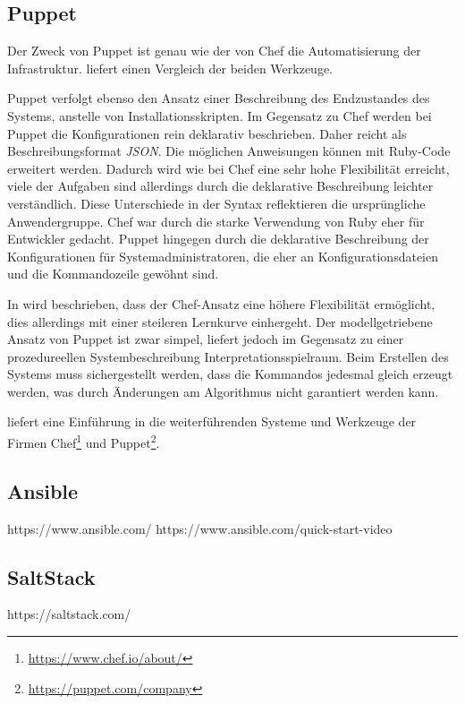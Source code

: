 \subsection{Puppet}
\label{sub:puppet}
Der Zweck von Puppet ist genau wie der von Chef die Automatisierung der Infrastruktur. \autocite{Wolff201604} liefert einen Vergleich der beiden Werkzeuge.

Puppet verfolgt ebenso den Ansatz einer Beschreibung des Endzustandes des Systems, anstelle von Installationsskripten.
Im Gegensatz zu Chef werden bei Puppet die Konfigurationen rein deklarativ beschrieben.
Daher reicht als Beschreibungsformat \emph{JSON}.
Die möglichen Anweisungen können mit Ruby-Code erweitert werden.
Dadurch wird wie bei Chef eine sehr hohe Flexibilität erreicht, viele der Aufgaben sind allerdings durch die deklarative Beschreibung leichter verständlich.
Diese Unterschiede in der Syntax reflektieren die ursprüngliche Anwendergruppe.
Chef war durch die starke Verwendung von Ruby eher für Entwickler gedacht.
Puppet hingegen durch die deklarative Beschreibung der Konfigurationen für Systemadministratoren, die eher an Konfigurationsdateien und die Kommandozeile gewöhnt sind.

In \autocite{chef-vs-puppet:online} wird beschrieben, dass der Chef-Ansatz eine höhere Flexibilität ermöglicht, dies allerdings mit einer steileren Lernkurve einhergeht.
Der modellgetriebene Ansatz von Puppet ist zwar simpel, liefert jedoch im Gegensatz zu einer prozedureellen Systembeschreibung Interpretationsspielraum.
Beim Erstellen des Systems muss sichergestellt werden, dass die Kommandos jedesmal gleich erzeugt werden, was durch Änderungen am Algorithmus nicht garantiert werden kann.

\autocite{chef-vs-puppet-revisited:online} liefert eine Einführung in die weiterführenden Systeme und Werkzeuge der Firmen Chef\footnote{\url{https://www.chef.io/about/}} und Puppet\footnote{\url{https://puppet.com/company}}.

\subsection{Ansible}
\label{sub:ansible}
https://www.ansible.com/
https://www.ansible.com/quick-start-video

\subsection{SaltStack}
\label{sub:saltstack}
https://saltstack.com/


